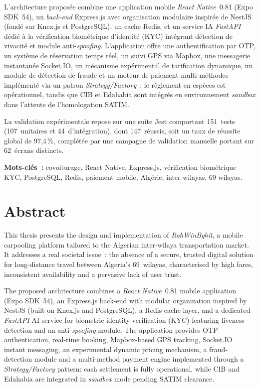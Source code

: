 L'architecture proposée combine une application mobile \textit{React Native}~0.81 (Expo SDK~54), un \textit{back-end} Express.js avec organisation modulaire inspirée de NestJS (fondé sur Knex.js et PostgreSQL), un cache Redis, et un service IA \textit{FastAPI} dédié à la vérification biométrique d'identité (KYC) intégrant détection de vivacité et module anti-\textit{spoofing}. L'application offre une authentification par OTP, un système de réservation temps réel, un suivi GPS via Mapbox, une messagerie instantanée Socket.IO, un mécanisme expérimental de tarification dynamique, un module de détection de fraude et un moteur de paiement multi-méthodes implémenté via un patron \textit{Strategy/Factory}~: le règlement en espèces est opérationnel, tandis que CIB et Edahabia sont intégrés en environnement \textit{sandbox} dans l'attente de l'homologation SATIM.

La validation expérimentale repose sur une suite Jest comportant 151~tests (107~unitaires et 44~d'intégration), dont 147~réussis, soit un taux de réussite global de 97,4\,\%, complétée par une campagne de validation manuelle portant sur 62~écrans distincts.

\vspace{0.3cm}
\textbf{Mots-clés~:} covoiturage, React Native, Express.js, vérification biométrique KYC, PostgreSQL, Redis, paiement mobile, Algérie, inter-wilayas, 69 wilayas.

\chapter*{Abstract}
\thispagestyle{plain}

This thesis presents the design and implementation of \textit{RohWinBghit}, a mobile carpooling platform tailored to the Algerian inter-wilaya transportation market. It addresses a real societal issue~: the absence of a secure, trusted digital solution for long-distance travel between Algeria's 69~wilayas, characterised by high fares, inconsistent availability and a pervasive lack of user trust.

The proposed architecture combines a \textit{React Native}~0.81 mobile application (Expo SDK~54), an Express.js back-end with modular organization inspired by NestJS (built on Knex.js and PostgreSQL), a Redis cache layer, and a dedicated \textit{FastAPI} AI service for biometric identity verification (KYC) featuring liveness detection and an anti-\textit{spoofing} module. The application provides OTP authentication, real-time booking, Mapbox-based GPS tracking, Socket.IO instant messaging, an experimental dynamic pricing mechanism, a fraud-detection module and a multi-method payment engine implemented through a \textit{Strategy/Factory} pattern: cash settlement is fully operational, while CIB and Edahabia are integrated in \textit{sandbox} mode pending SATIM clearance.

